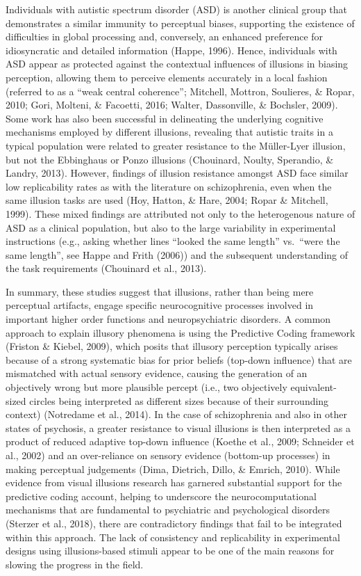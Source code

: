 \documentclass[
  english,
  man,floatsintext]{apa6}
\begin{document}
Individuals with autistic spectrum disorder (ASD) is another clinical group that demonstrates a similar immunity to perceptual biases, supporting the existence of difficulties in global processing and, conversely, an enhanced preference for idiosyncratic and detailed information (Happe, 1996). Hence, individuals with ASD appear as protected against the contextual influences of illusions in biasing perception, allowing them to perceive elements accurately in a local fashion (referred to as a ``weak central coherence''; Mitchell, Mottron, Soulieres, \& Ropar, 2010; Gori, Molteni, \& Facoetti, 2016; Walter, Dassonville, \& Bochsler, 2009). Some work has also been successful in delineating the underlying cognitive mechanisms employed by different illusions, revealing that autistic traits in a typical population were related to greater resistance to the Müller-Lyer illusion, but not the Ebbinghaus or Ponzo illusions (Chouinard, Noulty, Sperandio, \& Landry, 2013). However, findings of illusion resistance amongst ASD face similar low replicability rates as with the literature on schizophrenia, even when the same illusion tasks are used (Hoy, Hatton, \& Hare, 2004; Ropar \& Mitchell, 1999). These mixed findings are attributed not only to the heterogenous nature of ASD as a clinical population, but also to the large variability in experimental instructions (e.g., asking whether lines ``looked the same length'' vs.~``were the same length'', see Happe and Frith (2006)) and the subsequent understanding of the task requirements (Chouinard et al., 2013).

In summary, these studies suggest that illusions, rather than being mere perceptual artifacts, engage specific neurocognitive processes involved in important higher order functions and neuropsychiatric disorders. A common approach to explain illusory phenomena is using the Predictive Coding framework (Friston \& Kiebel, 2009), which posits that illusory perception typically arises because of a strong systematic bias for prior beliefs (top-down influence) that are mismatched with actual sensory evidence, causing the generation of an objectively wrong but more plausible percept (i.e., two objectively equivalent-sized circles being interpreted as different sizes because of their surrounding context) (Notredame et al., 2014). In the case of schizophrenia and also in other states of psychosis, a greater resistance to visual illusions is then interpreted as a product of reduced adaptive top-down influence (Koethe et al., 2009; Schneider et al., 2002) and an over-reliance on sensory evidence (bottom-up processes) in making perceptual judgements (Dima, Dietrich, Dillo, \& Emrich, 2010). While evidence from visual illusions research has garnered substantial support for the predictive coding account, helping to underscore the neurocomputational mechanisms that are fundamental to psychiatric and psychological disorders (Sterzer et al., 2018), there are contradictory findings that fail to be integrated within this approach. The lack of consistency and replicability in experimental designs using illusions-based stimuli appear to be one of the main reasons for slowing the progress in the field.
\end{document}
